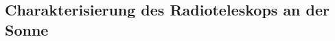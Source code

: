 \documentclass[../main.tex]{subfiles}
\begin{document}
    
    \subsection{Charakterisierung des Radioteleskops an der Sonne}\label{subsec:2:Sonne}
        

        
\end{document}
